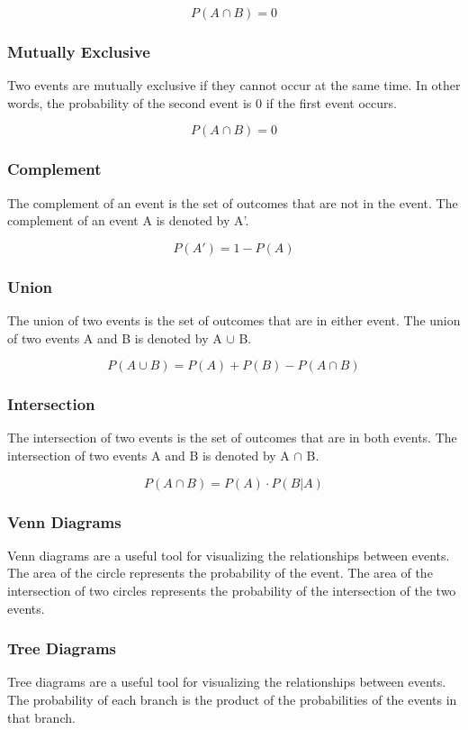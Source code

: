 \documentclass[11pt]{article}
\begin{document}
\[
P(A \cap B) = 0
\]

\subsubsection{Mutually Exclusive}
\label{sec:orgbf90091}
Two events are mutually exclusive if they cannot occur at the same time. In other words, the probability of the second event is 0 if the first event occurs.

\[
P(A \cap B) = 0
\]

\subsubsection{Complement}
\label{sec:org90f3275}
The complement of an event is the set of outcomes that are not in the event. The complement of an event A is denoted by A'.

\[
P(A') = 1 - P(A)
\]

\subsubsection{Union}
\label{sec:orgaea4a01}
The union of two events is the set of outcomes that are in either event. The union of two events A and B is denoted by A \(\cup\) B.

\[
P(A \cup B) = P(A) + P(B) - P(A \cap B)
\]

\subsubsection{Intersection}
\label{sec:org2c55943}
The intersection of two events is the set of outcomes that are in both events. The intersection of two events A and B is denoted by A \(\cap\) B.

\[
P(A \cap B) = P(A) \cdot P(B|A)
\]

\subsubsection{Venn Diagrams}
\label{sec:orgd411314}
Venn diagrams are a useful tool for visualizing the relationships between events. The area of the circle represents the probability of the event. The area of the intersection of two circles represents the probability of the intersection of the two events.

\subsubsection{Tree Diagrams}
\label{sec:orgd5be66b}
Tree diagrams are a useful tool for visualizing the relationships between events. The probability of each branch is the product of the probabilities of the events in that branch.
\end{document}
